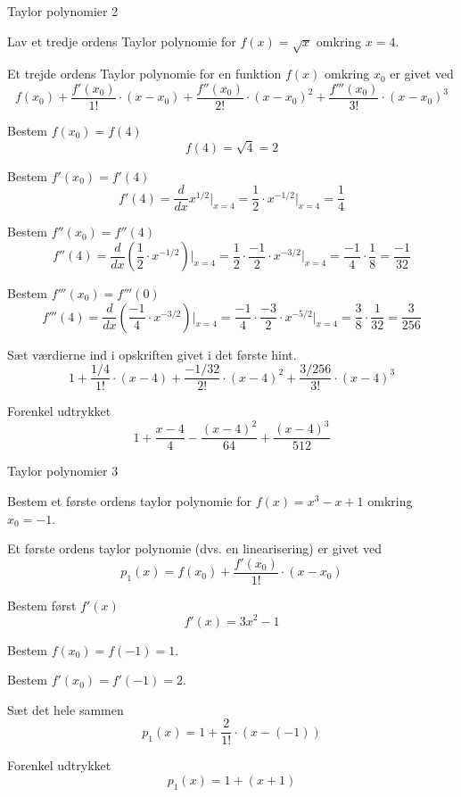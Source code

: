 \documentclass{article}
\begin{document}
\begin{exercise}{Taylor polynomier 2}

Lav et tredje ordens Taylor polynomie for $f(x) = \sqrt{x}$
omkring $x = 4$.


\hint
Et trejde ordens Taylor polynomie for en funktion $f(x)$
omkring $x_0$ er givet ved
\[
f(x_0) + \frac{f'(x_0)}{1!} \cdot (x - x_0) + \frac{f''(x_0)}{2!} \cdot (x - x_0)^2 + \frac{f'''(x_0)}{3!} \cdot (x - x_0)^3
\]

\hint
Bestem $f(x_0) = f(4)$
\[
f(4) = \sqrt{4} = 2
\]

\hint
Bestem $f'(x_0) = f'(4)$
\[
f'(4) = \frac{d}{dx} x^{1/2} \Big|_{x = 4} = \frac{1}{2} \cdot x^{-1/2} \Big|_{x = 4} = \frac{1}{4}
\]

\hint
Bestem $f''(x_0) = f''(4)$
\[
f''(4) = \frac{d}{dx} \left( \frac{1}{2} \cdot x^{-1/2} \right) \Big|_{x = 4} = \frac{1}{2} \cdot \frac{-1}{2} \cdot x^{-3/2} \Big|_{x = 4} = \frac{-1}{4} \cdot \frac{1}{8} = \frac{-1}{32}
\]

\hint
Bestem $f'''(x_0) = f'''(0)$
\[
f'''(4) = \frac{d}{dx} \left( \frac{-1}{4} \cdot x^{-3/2} \right) \Big|_{x = 4} = \frac{-1}{4} \cdot \frac{-3}{2} \cdot x^{-5/2} \Big|_{x = 4} = \frac{3}{8} \cdot \frac{1}{32} = \frac{3}{256}
\]

\hint
Sæt værdierne ind i opskriften givet i det første hint.
\[
1 + \frac{1/4}{1!} \cdot (x - 4) + \frac{-1 / 32}{2!} \cdot (x - 4)^2 + \frac{3 / 256}{3!} \cdot (x - 4)^3
\]

\hint
Forenkel udtrykket
\[
1 + \frac{x - 4}{4} - \frac{(x - 4)^2}{64} + \frac{(x - 4)^3}{512}
\]

\end{exercise}

\begin{exercise}{Taylor polynomier 3}

Bestem et første ordens taylor polynomie for $f(x) = x^3 - x + 1$
omkring $x_0 = -1$.


\hint
Et første ordens taylor polynomie (dvs. en linearisering)
er givet ved
\[
p_1(x) = f(x_0) + \frac{f'(x_0)}{1!} \cdot (x - x_0)
\]


\hint
Bestem først $f'(x)$
\[
f'(x) = 3x^2 - 1
\]

\hint
Bestem $f(x_0) = f(-1) = 1$.

\hint
Bestem $f'(x_0) = f'(-1) = 2$.

\hint
Sæt det hele sammen
\[
p_1(x) = 1 + \frac{2}{1!} \cdot \left(x - (-1)\right)
\]

\hint
Forenkel udtrykket
\[
p_1(x) = 1 + (x + 1)
\]


\end{exercise}
\end{document}

